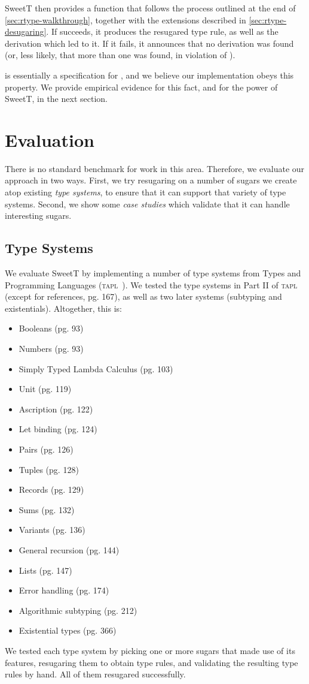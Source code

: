 {SweetT} then provides a  function that follows the
process outlined at the end of \cref{sec:rtype-walkthrough}, together with the extensions
described in \cref{sec:rtype-desugaring}. If  succeeds, it produces the
resugared type rule, as well as the derivation which led to it. If it
fails, it announces that no derivation was found (or, less likely,
that more than one was found, in violation of ).

 is essentially a specification for , and we believe
our implementation obeys this property. We provide empirical evidence
for this fact, and for the power of {SweetT}, in the next section.

\section{Evaluation}

There is no standard benchmark for work in this area. Therefore,
we evaluate our approach in two ways.
First, we try resugaring on a number of sugars we create atop existing
\emph{type systems}, to ensure
that it can support that variety of type systems. Second, we show some
\emph{case studies} which validate that it can handle interesting
sugars.

\subsection{Type Systems}\label{sec:rtype-eval-type}

We evaluate {SweetT} by implementing a number of type systems from
Types and Programming Languages (\textsc{tapl}~\cite{tapl}).
We tested the type systems in Part II of \textsc{tapl}
(except for references, pg. 167), as well as two
later systems (subtyping and existentials). Altogether, this is:
\begin{itemize}[noitemsep]
\item Booleans (pg. 93)
\item Numbers (pg. 93)
\item Simply Typed Lambda Calculus (pg. 103)
\item Unit (pg. 119)
\item Ascription (pg. 122)
\item Let binding (pg. 124)
\item Pairs (pg. 126)
\item Tuples (pg. 128)
\item Records (pg. 129)
\item Sums (pg. 132)
\item Variants (pg. 136)
\item General recursion (pg. 144)
\item Lists (pg. 147)
\item Error handling (pg. 174)
\item Algorithmic subtyping (pg. 212)
\item Existential types (pg. 366)
\end{itemize}
We tested each type system by picking one or more sugars that made use
of its features, resugaring them to obtain type rules, and validating
the resulting type rules by hand. All of them resugared
successfully.

